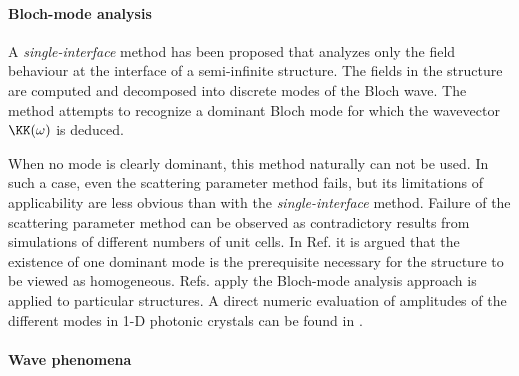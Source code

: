
\paragraph{Bloch-mode analysis} %
A \textit{single-interface} method has been proposed \cite{yang2010retrieving} %
that analyzes only the field behaviour at the interface of a semi-infinite structure.  
The fields in the structure are computed and decomposed into discrete modes of the Bloch wave. The method attempts to recognize a dominant Bloch mode for which the wavevector $\KK(\omega)$ is deduced.
\cite{zhang2006optical} %
\cite{rockstuhl2008light} %

When no mode is clearly dominant, this method naturally can not be used. In such a case, even the scattering parameter method fails, but its limitations of applicability are less obvious than with the \textit{single-interface} method. Failure of the scattering parameter method can be observed as contradictory results \cite{rockstuhl2008transition} from simulations of different numbers of unit cells.
In Ref. \cite{paul2011reflection} %
it is argued that the existence of one dominant mode is the prerequisite necessary for the structure to be viewed as homogeneous. Refs. \cite{paul2011reflection,andryieuski2012bloch} apply the Bloch-mode analysis approach is applied to particular structures. A direct numeric evaluation of amplitudes of the different modes in 1-D photonic crystals can be found in 
\cite{mortensen2010unambiguous}. %


\paragraph{Wave phenomena} %

